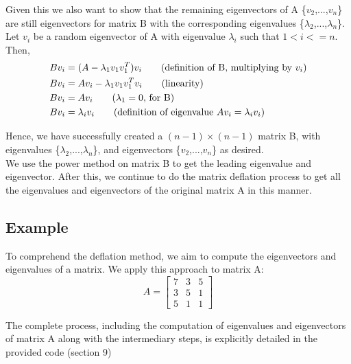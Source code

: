 \documentclass[11pt]{article}
\begin{document}
Given this we also want to show that the remaining eigenvectors of A  \{$v_{2}$,...,$v_{n}$\} are still eigenvectors for matrix B with the corresponding eigenvalues \{$\lambda_{2}$,...,$\lambda_{n}$\}.\\

Let $v_{i}$ be a random eigenvector of A with eigenvalue $\lambda_{i}$ such that $1<i<=n$. Then,\\

\begin{align*}
    & Bv_{i} = (A - \lambda_{1}v_{1}v_{1}^{T})v_{i} \tag{definition of B, multiplying by $v_{i}$}\\ 
    & Bv_{i} = Av_{i} - \lambda_{1}v_{1}v_{1}^{T}v_{i} \tag{linearity}\\ 
    & Bv_{i} = Av_{i} \tag{$\lambda_{1} = 0$, for B}\\
    & Bv_{i} = \lambda_{i}v_{i} \tag{definition of eigenvalue $Av_{i} = \lambda_{i}v_{i}$}
\end{align*}

Hence, we have successfully created a $(n-1) \times (n-1)$ matrix B, with eigenvalues \{$\lambda_{2}$,...,$\lambda_{n}$\}, and eigenvectors  \{$v_{2}$,...,$v_{n}$\} as desired.\\

We use the power method on matrix B to get the leading eigenvalue and eigenvector. After this, we continue to do the matrix deflation process to get all the eigenvalues and eigenvectors of the original matrix A in this manner.



\subsection{Example}
To comprehend the deflation method, we aim to compute the eigenvectors and eigenvalues of a matrix. We apply this approach to matrix A:
\[ A = \begin{bmatrix} 7 & 3 & 5 \\ 3 & 5 & 1 \\ 5 & 1 & 1 \end{bmatrix} \]

The complete process, including the computation of eigenvalues and eigenvectors of matrix A along with the intermediary steps, is explicitly detailed in the provided code (section 9)
\end{document}
